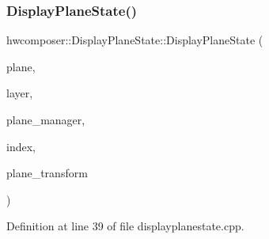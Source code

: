 \subsubsection{\texorpdfstring{Display\+Plane\+State()}{DisplayPlaneState()}\hspace{0.1cm}{\footnotesize\ttfamily [3/3]}}
{\footnotesize\ttfamily hwcomposer\+::\+Display\+Plane\+State\+::\+Display\+Plane\+State (\begin{DoxyParamCaption}\item[{\mbox{\hyperlink{classhwcomposer_1_1DisplayPlane}{Display\+Plane}} $\ast$}]{plane,  }\item[{\mbox{\hyperlink{structhwcomposer_1_1OverlayLayer}{Overlay\+Layer}} $\ast$}]{layer,  }\item[{\mbox{\hyperlink{classhwcomposer_1_1DisplayPlaneManager}{Display\+Plane\+Manager}} $\ast$}]{plane\+\_\+manager,  }\item[{uint32\+\_\+t}]{index,  }\item[{uint32\+\_\+t}]{plane\+\_\+transform }\end{DoxyParamCaption})}



Definition at line 39 of file displayplanestate.\+cpp.


